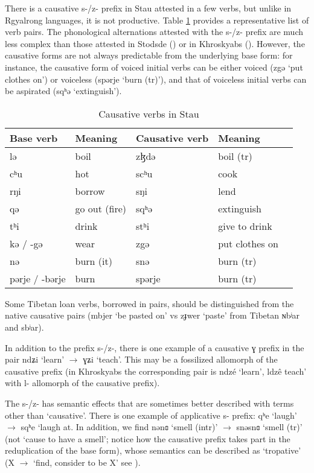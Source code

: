 \documentclass[oneside,a4paper,11pt]{article}
\newcommand{\ipa}[1]{{\phon #1}} %
\begin{document}
There is a causative \ipa{s-/z-} prefix in Stau attested in a few verbs, but unlike in Rgyalrong languages, it is not productive. Table \ref{tab:causative} provides a representative list of verb pairs. The phonological alternations attested with the \ipa{s-/z-} prefix are much less complex than those attested in Stodsde (\citealt{jackson07shangzhai}) or in Khroskyabs (\citealt{lai14caus}). However, the causative forms are not always predictable from the underlying base form: for instance, the causative form of voiced initial verbs can be either voiced (\ipa{zgə} `put clothes on') or voiceless (\ipa{spərje} `burn (tr)'), and that of voiceless initial verbs can be aspirated (\ipa{sqʰə} `extinguish').
 
 
   \begin{table}[H]
 \caption{Causative verbs in Stau} \label{tab:causative} \centering 
\begin{tabular}{lllll}
\toprule
Base verb & Meaning & Causative verb & Meaning \\
\midrule
 \ipa{lə}  &boil& \ipa{zɮdə}& boil (tr)\\
  \ipa{cʰu}  & hot &  \ipa{scʰu}& cook \\
    \ipa{rŋi}  & borrow &  \ipa{sŋi}& lend \\
    \ipa{qə}  & go out (fire) &  \ipa{sqʰə}& extinguish\\
    \ipa{tʰi}  & drink &  \ipa{stʰi} & give to drink\\
    \ipa{kə} / \ipa{-gə} & wear &  \ipa{zgə} & put clothes on \\
     \ipa{nə}  & burn (it) &  \ipa{snə}& burn (tr)\\
     \ipa{pərje} / \ipa{-bərje} & burn &  \ipa{spərje} & burn (tr)\\
 \bottomrule
\end{tabular}
\end{table}

Some Tibetan loan verbs, borrowed in pairs, should be distinguished from the native causative pairs (\ipa{mbjer} `be pasted on' vs \ipa{zɟwer}  `paste' from Tibetan \ipa{ɴbʲar} and \ipa{sbʲar}).
 
 
 In addition to the prefix \ipa{s-/z-}, there is one example of a causative \ipa{ɣ} prefix in the pair   \ipa{ndʑi} `learn'    $\rightarrow$  \ipa{ɣʑi} `teach'. This may be a fossilized allomorph of the causative prefix (in Khroskyabs the corresponding pair is \ipa{ndzé} `learn', \ipa{ldzê}  teach' with \ipa{l-} allomorph of the causative prefix).
     
The \ipa{s-/z-} has semantic effects that are sometimes better described with terms other than `causative'. There is one example of applicative \ipa{s-} prefix: \ipa{qʰe}  `laugh' $\rightarrow$ \ipa{sqʰe} `laugh at. In addition, we find \ipa{nənɞ}  `smell (intr)' $\rightarrow$ \ipa{snəsnɞ} `smell (tr)' (not `cause to have a smell'; notice how the causative prefix takes part in the reduplication of the base form), whose semantics can be described as `tropative' (X $\rightarrow$ `find, consider to be X' see \citealt{jacques13tropative}).
\end{document}
